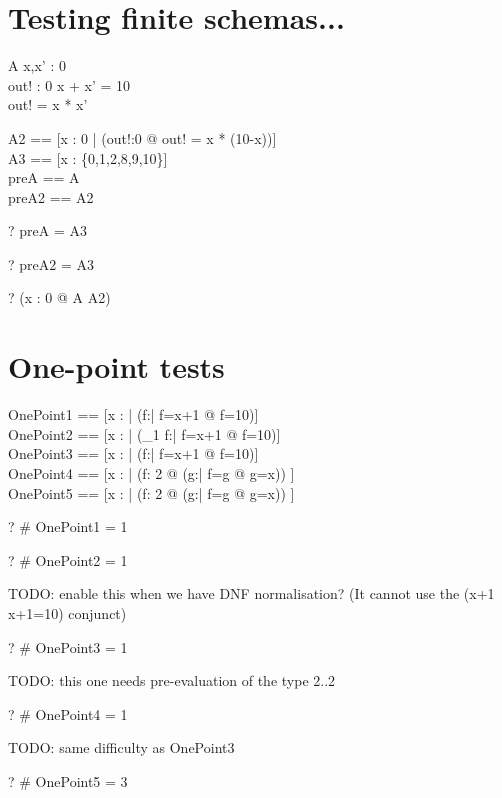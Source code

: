 \documentclass{article}
\begin{document}
\section{Testing finite schemas...}

\begin{schema}{A}
  x,x' : 0  \\
  out! : 0 
\where
  x + x' = 10 \\
  out! = x * x'
\end{schema}

\begin{zed}
  A2 == [x : 0  | (\exists out!:0  @ out! = x * (10-x))]
\\
  A3 == [x : \{0,1,2,8,9,10\}]
\\
  preA == \pre A
\\
  preA2 == \pre A2
\end{zed}

\begin{zed} \vdash? preA = A3 \end{zed}
\begin{zed} \vdash? preA2 = A3 \end{zed}

\begin{zed} \vdash? (\forall x : 0  @ \pre A \iff A2) \end{zed}

\section{One-point tests}
\begin{zed}
  OnePoint1 == [x : \nat | (\exists   f:\nat | f=x+1 @ f=10)] \\
  OnePoint2 == [x : \nat | (\exists_1 f:\nat | f=x+1 @ f=10)] \\
  OnePoint3 == [x : \nat | (\forall   f:\nat | f=x+1 @ f=10)] \\
  OnePoint4 == [x : \nat | (\forall f: 2  @
                               (\exists g:\nat | f=g @ g=x)) ] \\
  OnePoint5 == [x : \nat | (\exists f: 2  @
                               (\forall g:\nat | f=g @ g=x)) ]
\end{zed}

\begin{zed} \vdash? \# OnePoint1 = 1 \end{zed}
\begin{zed} \vdash? \# OnePoint2 = 1 \end{zed}
TODO: enable this when we have DNF normalisation?
(It cannot use the (x+1 \in \nat \implies x+1=10) conjunct)
\begin{zed} \vdash? \# OnePoint3 = 1 \end{zed}
TODO: this one needs pre-evaluation of the type 2..2
\begin{zed} \vdash? \# OnePoint4 = 1 \end{zed}
TODO: same difficulty as OnePoint3
\begin{zed} \vdash? \# OnePoint5 = 3 \end{zed}
\end{document}
